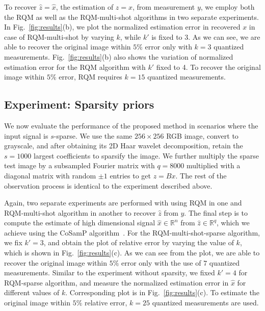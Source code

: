To recover $\widehat{z} = \widehat{x}$, the estimation of $z =x$, from measurement $y$, we employ both the RQM as well as the RQM-multi-shot algorithms in two separate experiments.
In Fig.~\ref{fig:results}(b), we plot the normalized estimation error in recovered $x$ in case of RQM-multi-shot by varying $k$, while $k'$ is fixed to 3. As we can see, we are able to recover the original image within $5\%$ error only with $k=3$ quantized measurements. Fig.~\ref{fig:results}(b) also shows the variation of normalized estimation error for the RQM algorithm with $k'$ fixed to 4. To recover the original image within $5\%$ error, RQM requires $k=15$ quantized measurements. 

	\vspace{-0.7em}%
\subsection{Experiment: Sparsity priors}
	\vspace{-0.3em}%
We now evaluate the performance of the proposed method in scenarios where the input signal is $s$-sparse. We use the same $256 \times 256$ RGB image, convert to grayscale, and after obtaining its 2D Haar wavelet decomposition, retain the $s=1000$ largest coefficients to sparsify the image. We further multiply the sparse test image by a subsampled Fourier matrix with $q=8000$ multiplied with a diagonal matrix with random $\pm1$ entries to get $z=Bx$. The rest of the observation process is identical to the experiment described above.

Again, two separate experiments are performed with using RQM in one and RQM-multi-shot algorithm in another to recover $\widehat{z}$ from $y$. The final step is to compute the estimate of high dimensional signal $\widehat{x} \in \mathbb{R}^n$ from $\widehat{z} \in \mathbb{R}^q$, which we achieve using the CoSamP algorithm~\cite{cosamp}.
For the RQM-multi-shot-sparse algorithm, we fix $k' = 3$, and obtain the plot of relative error by varying the value of $k$, which is shown in Fig.~\ref{fig:results}(c). As we can see from the plot, we are able to recover the original image within $5\%$ error only with the use of $7$ quantized measurements. Similar to the experiment without sparsity, we fixed $k'=4$ for RQM-sparse algorithm, and measure the normalized estimation error in $\hat{x}$ for different values of $k$. Corresponding plot is in Fig.~\ref{fig:results}(c). To estimate the original image within $5\%$ relative error, $k=25$ quantized measurements are used.

